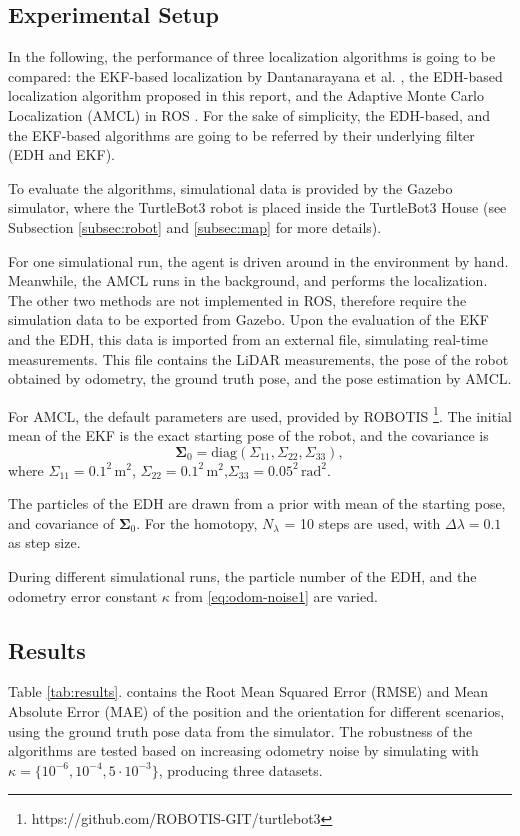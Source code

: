 \subsection{Experimental Setup}

In the following, the performance of three localization algorithms is going to be compared:
the EKF-based localization  by Dantanarayana et al. \cite{Dantanarayana2016},
the EDH-based localization  algorithm proposed in this report,
and the Adaptive Monte Carlo Localization (AMCL) in ROS \cite{AMCLROS2002}.
For the sake of simplicity, the EDH-based, and the EKF-based
algorithms are going to be referred by their underlying filter (EDH and EKF).

To evaluate the algorithms, simulational data is provided by the Gazebo
simulator, where the TurtleBot3 robot is placed inside the TurtleBot3 House
(see Subsection \ref{subsec:robot} and \ref{subsec:map} for more details).

For one simulational run, the agent is driven around in the environment by hand.
Meanwhile, the AMCL runs in the background, and performs the localization.
The other two methods are not implemented in ROS, therefore require the
simulation data to be exported from Gazebo.
Upon the evaluation of the EKF and the EDH, this data is imported
from an external file, simulating real-time measurements.
This file contains the LiDAR measurements, the pose of the robot obtained
by odometry,
the ground truth pose, and the pose estimation by AMCL.

For AMCL, the default parameters are used, provided by ROBOTIS \footnote{https://github.com/ROBOTIS-GIT/turtlebot3}.
The initial mean of the EKF is the exact starting pose of the robot, and the
covariance is
\begin{equation}
    \boldsymbol\Sigma_0 = \text{diag}(\Sigma_{11},\Sigma_{22},\Sigma_{33}),
\end{equation}
where $\Sigma_{11} = 0.1^2\,\text{m}^2$,
$\Sigma_{22} = 0.1^2\,\text{m}^2$,$\Sigma_{33} = 0.05^2\,\text{rad}^2$.

The particles of the EDH are drawn from a prior with mean of the starting pose,
and covariance of $\boldsymbol\Sigma_0$.
For the homotopy, $N_\lambda$ = 10 steps are used, with $\Delta\lambda = 0.1$ as step size.

During different simulational runs, the particle number of the EDH,
and the odometry error constant $\kappa$ from \eqref{eq:odom-noise1} are varied.
\pagebreak
\subsection{Results}
Table \ref{tab:results}. contains the Root Mean Squared Error (RMSE) and Mean Absolute Error (MAE)
of the position and the orientation for different scenarios, using the ground truth pose data
from the simulator. The robustness of the algorithms are tested based on increasing odometry
noise by simulating with $\kappa = \{10^{-6},10^{-4},5\cdot10^{-3}\}$, producing three datasets.

